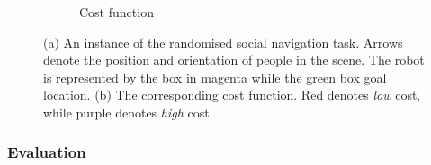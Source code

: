 \documentclass[letterpaper, 10 pt, conference]{ieeeconf}
\newcommand{\sw}[1]{\textcolor{red}{SW: #1}}
\newcommand{\ks}[1]{\textcolor{green}{KS: #1}}
\begin{document}
\begin{figure}[tbh]
\begin{subfigure}[b]{0.35\columnwidth}
    \caption{Cost function}
    \label{fig:cost_f}
  \end{subfigure} 

  \caption{(a) An instance of the randomised social navigation task. Arrows denote the position and orientation of people in the scene. The robot is represented by the box in magenta while the green box goal location. (b) The corresponding cost function. Red denotes \emph{low} cost, while purple denotes \emph{high} cost.}

    \vspace{-2mm}

  \label{fig:setting}
  \end{figure}




	\subsubsection{Evaluation}
\end{document}
